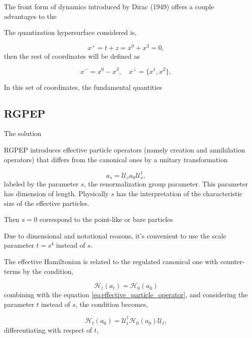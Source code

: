 \documentclass[11pt,a4paper,twoside,pdf]{article}
\numberwithin{equation}{section}
\begin{document}
The front form of dynamics introduced by Dirac (1949) \cite{dirac_front_forms_1949} 
offers a couple advantages to the 

The quantization hypersurface considered is,

\begin{equation}
    x^+ = t+z = x^0 + x^3 = 0,
\end{equation}
then the rest of coordinates will be defined as

\begin{equation}
    x^- = x^0-x^3, \quad x^\perp = \{x^1, x^2\},
\end{equation}

In this set of coordinates, the fundamental quantities 

\subsection{RGPEP}

The solution 

RGPEP introduces effective particle operators (namely creation and annihilation 
operators) that differs from the canonical ones by a unitary transformation

\begin{equation}
    a_s = \mathcal{U}_sa_0\mathcal{U}_s^\dagger,
    \label{eq:effective_particle_operator}
\end{equation}
labeled by the parameter $s$, the renormalization group parameter. This parameter 
has dimension of length. Physically $s$ has the interpretation of the characteristic 
size of the effective particles.

Then $s=0$ correspond to the point-like or bare particles

Due to dimensional and notational reasons, it's convenient to use the scale parameter 
$t = s^4$ instead of $s$.

The effective Hamiltonian is related to the regulated canonical one with counter-terms 
by the condition,

\begin{equation}
    \mathcal{H}_t(a_t) = \mathcal{H}_0(a_0)
\end{equation}
combining with the equation \eqref{eq:effective_particle_operator}, and considering 
the parameter $t$ instead of $s$, the condition becomes,

\begin{equation}
    \mathcal{H}_t(a_0) = \mathcal{U}_t^\dagger\mathcal{H}_0(a_0) \mathcal{U}_t,
\end{equation}
differentiating with respect of $t$, 
\end{document}
